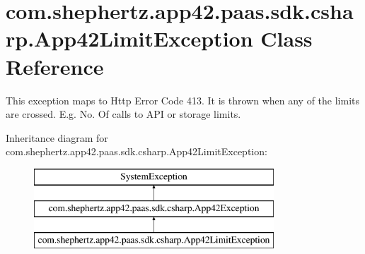 \hypertarget{classcom_1_1shephertz_1_1app42_1_1paas_1_1sdk_1_1csharp_1_1_app42_limit_exception}{\section{com.\+shephertz.\+app42.\+paas.\+sdk.\+csharp.\+App42\+Limit\+Exception Class Reference}
\label{classcom_1_1shephertz_1_1app42_1_1paas_1_1sdk_1_1csharp_1_1_app42_limit_exception}
}


This exception maps to Http Error Code 413. It is thrown when any of the limits are crossed. E.\+g. No. Of calls to A\+P\+I or storage limits.  


Inheritance diagram for com.\+shephertz.\+app42.\+paas.\+sdk.\+csharp.\+App42\+Limit\+Exception\+:\begin{figure}[H]
\begin{center}
\leavevmode
\includegraphics[height=3.000000cm]{classcom_1_1shephertz_1_1app42_1_1paas_1_1sdk_1_1csharp_1_1_app42_limit_exception}
\end{center}
\end{figure}
